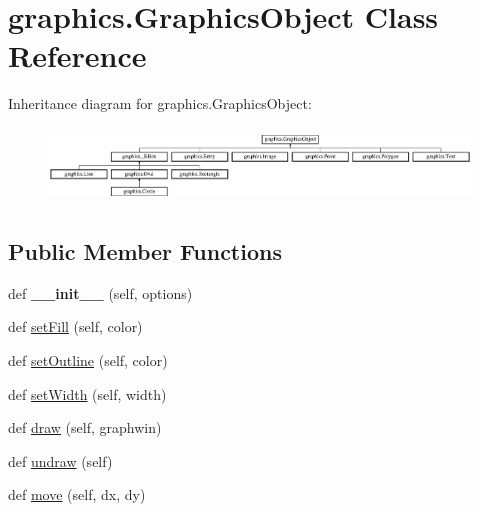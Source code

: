 \hypertarget{classgraphics_1_1_graphics_object}{}\section{graphics.\+Graphics\+Object Class Reference}
\label{classgraphics_1_1_graphics_object}
Inheritance diagram for graphics.\+Graphics\+Object\+:\begin{figure}[H]
\begin{center}
\leavevmode
\includegraphics[height=1.987578cm]{classgraphics_1_1_graphics_object}
\end{center}
\end{figure}
\subsection*{Public Member Functions}
\begin{DoxyCompactItemize}
\item 
def {\bfseries \+\_\+\+\_\+init\+\_\+\+\_\+} (self, options)\hypertarget{classgraphics_1_1_graphics_object_a87c93d91bf82269f0b31c1e669b7ddf4}{}\label{classgraphics_1_1_graphics_object_a87c93d91bf82269f0b31c1e669b7ddf4}

\item 
def \hyperlink{classgraphics_1_1_graphics_object_acfba33cbf63f5333f961b86e988fc292}{set\+Fill} (self, color)
\item 
def \hyperlink{classgraphics_1_1_graphics_object_a0acf1399e539cc273170096552a04139}{set\+Outline} (self, color)
\item 
def \hyperlink{classgraphics_1_1_graphics_object_a63006871dd6242bfc7aabe9ddcbb1263}{set\+Width} (self, width)
\item 
def \hyperlink{classgraphics_1_1_graphics_object_ac7849154dccab74cb76d2a28035db48c}{draw} (self, graphwin)
\item 
def \hyperlink{classgraphics_1_1_graphics_object_a7dc6432aa782c84f61407362e579aaf5}{undraw} (self)
\item 
def \hyperlink{classgraphics_1_1_graphics_object_a2dc26fc41e5fa51c7a97b592da2926e8}{move} (self, dx, dy)
\end{DoxyCompactItemize}
